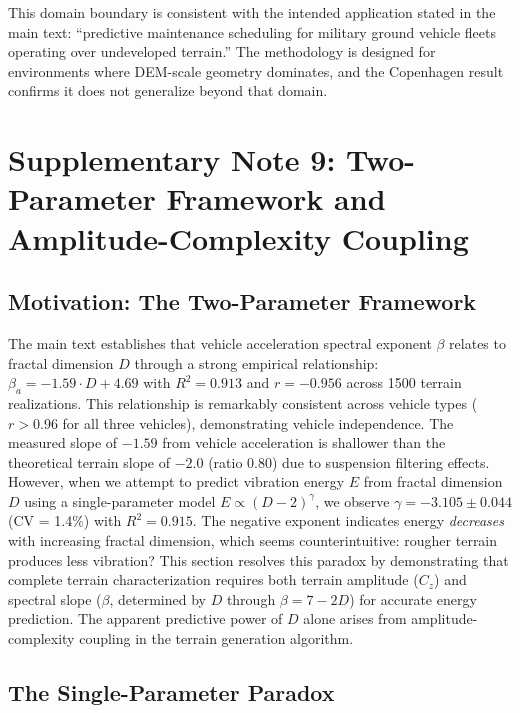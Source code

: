 \documentclass[11pt,letterpaper]{article}
\begin{document}
This domain boundary is consistent with the intended application stated in the main text: ``predictive maintenance scheduling for military ground vehicle fleets operating over undeveloped terrain.'' The methodology is designed for environments where DEM-scale geometry dominates, and the Copenhagen result confirms it does not generalize beyond that domain.

\newpage

\section{Supplementary Note 9: Two-Parameter Framework and Amplitude-Complexity Coupling}

\subsection{Motivation: The Two-Parameter Framework}

The main text establishes that vehicle acceleration spectral exponent $\beta$ relates to fractal dimension $D$ through a strong empirical relationship: $\beta_a = -1.59 \cdot D + 4.69$ with $R^2 = 0.913$ and $r = -0.956$ across 1500 terrain realizations. This relationship is remarkably consistent across vehicle types ($r > 0.96$ for all three vehicles), demonstrating vehicle independence. The measured slope of $-1.59$ from vehicle acceleration is shallower than the theoretical terrain slope of $-2.0$ (ratio 0.80) due to suspension filtering effects. However, when we attempt to predict vibration energy $E$ from fractal dimension $D$ using a single-parameter model $E \propto (D-2)^\gamma$, we observe $\gamma = -3.105 \pm 0.044$ (CV = 1.4\%) with $R^2 = 0.915$. The negative exponent indicates energy \textit{decreases} with increasing fractal dimension, which seems counterintuitive: rougher terrain produces less vibration? This section resolves this paradox by demonstrating that complete terrain characterization requires both terrain amplitude ($C_z$) and spectral slope ($\beta$, determined by $D$ through $\beta = 7-2D$) for accurate energy prediction. The apparent predictive power of $D$ alone arises from amplitude-complexity coupling in the terrain generation algorithm.

\subsection{The Single-Parameter Paradox}
\end{document}
